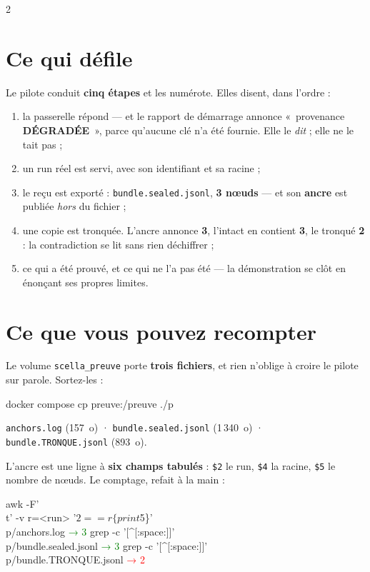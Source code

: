\documentclass[9pt]{extarticle}
\newcommand{\code}[1]{\texttt{\footnotesize #1}}
\begin{document}
\begin{multicols}{2}

\section{Ce qui défile}
Le pilote conduit \textbf{cinq étapes} et les numérote. Elles disent, dans l'ordre :

\begin{enumerate}[leftmargin=1.15em,itemsep=1pt,topsep=1.5pt]
\item la passerelle répond --- et le rapport de démarrage annonce
      «~provenance \textbf{DÉGRADÉE}~», parce qu'aucune clé n'a été fournie. Elle le
      \emph{dit} ; elle ne le tait pas ;
\item un run réel est servi, avec son identifiant et sa racine ;
\item le reçu est exporté : \code{bundle.sealed.jsonl}, \textbf{3 nœuds} --- et son \textbf{ancre}
      est publiée \emph{hors} du fichier ;
\item une copie est tronquée. L'ancre annonce \textbf{3}, l'intact en contient \textbf{3}, le
      tronqué \textbf{2} : la contradiction se lit sans rien déchiffrer ;
\item ce qui a été prouvé, et ce qui ne l'a pas été --- la démonstration se clôt en
      énonçant ses propres limites.
\end{enumerate}

\section{Ce que vous pouvez recompter}
Le volume \code{scella\_preuve} porte \textbf{trois fichiers}, et rien n'oblige à croire le pilote
sur parole. Sortez-les :
\begin{cmd}
docker compose cp preuve:/preuve ./p
\end{cmd}
\vspace{-2pt}
\code{anchors.log} (157~o) · \code{bundle.sealed.jsonl} (1\,340~o) ·
\code{bundle.TRONQUE.jsonl} (893~o).

\smallskip
L'ancre est une ligne à \textbf{six champs tabulés} : \code{\$2} le run, \code{\$4} la racine,
\code{\$5} le nombre de n\oe uds. Le comptage, refait à la main :

\begin{cmd}
awk -F'\\t' -v r=<run> '$2==r \{print $5\}' \\
    p/anchors.log            \textcolor{green}{→ 3}
grep -c '[^[:space:]]' \\
    p/bundle.sealed.jsonl    \textcolor{green}{→ 3}
grep -c '[^[:space:]]' \\
    p/bundle.TRONQUE.jsonl   \textcolor{red}{→ 2}
\end{cmd}


\end{multicols}
\end{document}
